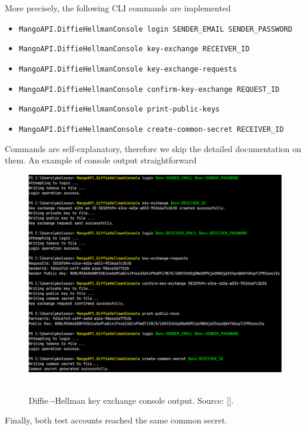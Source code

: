 More precisely, the following CLI commands are implemented
\begin{itemize}
    \item \texttt{MangoAPI.DiffieHellmanConsole login SENDER\_EMAIL SENDER\_PASSWORD}
    \item \texttt{MangoAPI.DiffieHellmanConsole key-exchange RECEIVER\_ID}
    \item \texttt{MangoAPI.DiffieHellmanConsole key-exchange-requests}
    \item \texttt{MangoAPI.DiffieHellmanConsole confirm-key-exchange REQUEST\_ID}
    \item \texttt{MangoAPI.DiffieHellmanConsole print-public-keys}
    \item \texttt{MangoAPI.DiffieHellmanConsole create-common-secret RECEIVER\_ID}
\end{itemize}
Commands are self-explanatory, therefore we skip the detailed documentation on them.
An example of console output straightforward
\begin{figure}[H]
    \centering
    \includegraphics[width=1\textwidth]{Pictures/08_Diffie-Hellman_console_output}
    ~\caption{Diffie–-Hellman key exchange console output. Source: [\cite{mango2021figma}].}\label{fig:figure7}
\end{figure}
Finally, both test accounts reached the same common secret.